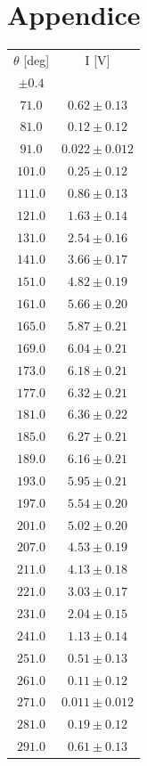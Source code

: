 \documentclass[10pt,oneside,a4paper]{article}
\begin{document}
\section{Appendice}

\begin{table}[H]
\centering
{}
\label{tab:malus1}
\begin{tabular}{cc}
\hline
 $\theta$ [deg]& I [V]\\
 $\pm 0.4$ & \\
\hline
 $ 71.0 $& $  0.62  \pm 0.13 $\\
 $  81.0$  &$ 0.12\pm 0.12 $\\
 $ 91.0 $& $ 0.022 \pm 0.012  $\\
 $101.0$ &$  0.25 \pm 0.12 $\\
  $111.0 $ & $ 0.86 \pm 0.13 $\\
 $121.0$ &$  1.63 \pm 0.14 $\\
 $131.0$ &$  2.54 \pm 0.16 $ \\
 $141.0$ &$  3.66 \pm 0.17 $\\
 $151.0$ &$  4.82 \pm 0.19 $\\
 $161.0$ &$  5.66 \pm 0.20  $\\
 $165.0$ &$  5.87 \pm 0.21 $\\
 $169.0$ &$  6.04 \pm 0.21 $\\
 $173.0$ &$  6.18 \pm 0.21 $\\
 $177.0$ &$  6.32 \pm 0.21 $\\
 $181.0$ &$  6.36 \pm 0.22 $\\
 $185.0$ &$  6.27 \pm 0.21 $\\
 $189.0$ &$  6.16 \pm 0.21 $\\
 $193.0$ &$  5.95 \pm 0.21 $\\
 $197.0$ &$  5.54 \pm 0.20 $\\
 $201.0$ &$  5.02 \pm 0.20 $\\
 $207.0$ &$  4.53 \pm 0.19 $\\
 $ 211.0$ &$ 4.13 \pm 0.18$ \\
 $221.0$ &$  3.03 \pm 0.17 $\\
 $231.0$ &$  2.04 \pm 0.15 $\\
 $241.0$ &$  1.13 \pm 0.14 $\\
 $251.0$ &$  0.51 \pm 0.13 $\\
 $261.0$ &$  0.11 \pm 0.12 $ \\
 $271.0$ &$  0.011 \pm 0.012 $\\
 $281.0$ &$  0.19 \pm 0.12 $\\
 $291.0$ &$  0.61 \pm 0.13 $\\
\hline
\end{tabular}
\end{table}
\end{document}
